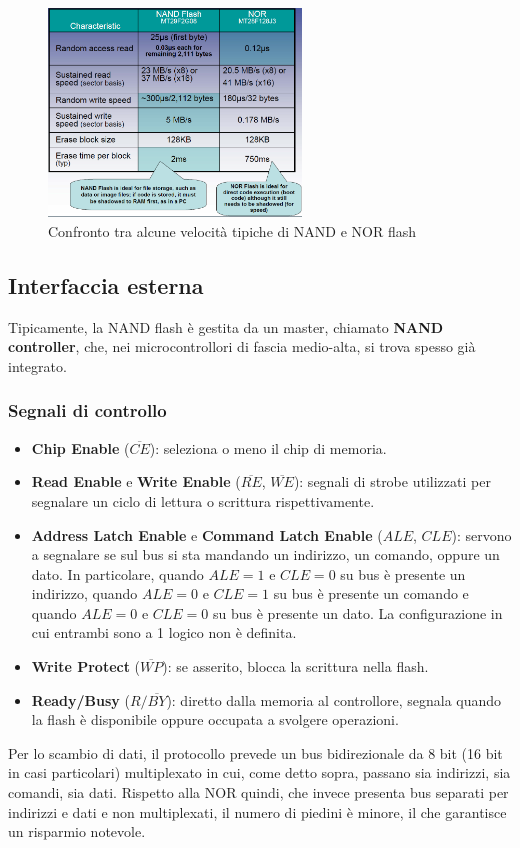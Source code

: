 \documentclass[11pt,4paper]{report}
\begin{document}
\begin{figure}[hbtp]
	\centering
	\includegraphics[width=0.6\textwidth]{memorie/jc_numeri}
	\caption{Confronto tra alcune velocità tipiche di NAND e NOR flash}
\end{figure}

\subsection{Interfaccia esterna}
Tipicamente, la NAND flash è gestita da un master, chiamato \textbf{NAND controller}, che, nei microcontrollori di fascia medio-alta, si trova spesso già integrato. 

\subsubsection{Segnali di controllo}
\begin{itemize}
	\item \textbf{Chip Enable} ($\overline{CE}$): seleziona o meno il chip di memoria.
	\item \textbf{Read Enable} e \textbf{Write Enable} ($\overline{RE}$, $\overline{WE}$): segnali di strobe utilizzati per segnalare un ciclo di lettura o scrittura rispettivamente.
	\item \textbf{Address Latch Enable} e \textbf{Command Latch Enable} ($ALE$, $CLE$): servono a segnalare se sul bus si sta mandando un indirizzo, un comando, oppure un dato. In particolare, quando $ALE=1$ e $CLE=0$ su bus è presente un indirizzo, quando $ALE=0$ e $CLE=1$ su bus è presente un comando e quando $ALE=0$ e $CLE=0$ su bus è presente un dato. La configurazione in cui entrambi sono a 1 logico non è definita.
	\item \textbf{Write Protect} ($\overline{WP}$): se asserito, blocca la scrittura nella flash.
	\item \textbf{Ready/Busy} ($R/\overline{BY}$): diretto dalla memoria al controllore, segnala quando la flash è disponibile oppure occupata a svolgere operazioni. 
\end{itemize}
Per lo scambio di dati, il protocollo prevede un bus bidirezionale da 8 bit (16 bit in casi particolari) multiplexato in cui, come detto sopra, passano sia indirizzi, sia comandi, sia dati. Rispetto alla NOR quindi, che invece presenta bus separati per indirizzi e dati e non multiplexati, il numero di piedini è minore, il che garantisce un risparmio notevole.
\end{document}
